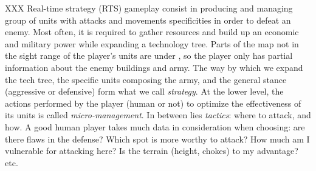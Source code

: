 XXX Real-time strategy (RTS) gameplay consist in producing and managing group of units with attacks and movements specificities in order to defeat an enemy. Most often, it is required to gather resources and build up an economic and military power while expanding a technology tree. Parts of the map not in the sight range of the player's units are under \textit{}, so the player only has partial information about the enemy buildings and army. The way by which we expand the tech tree, the specific units composing the army, and the general stance (aggressive or defensive) form what we call \textit{strategy}. At the lower level, the actions performed by the player (human or not) to optimize the effectiveness of its units is called \textit{micro-management}. In between lies \textit{tactics}: where to attack, and how. A good human player takes much data in consideration when choosing: are there flaws in the defense? Which spot is more worthy to attack? How much am I vulnerable for attacking here? Is the terrain (height, chokes) to my advantage? etc.

